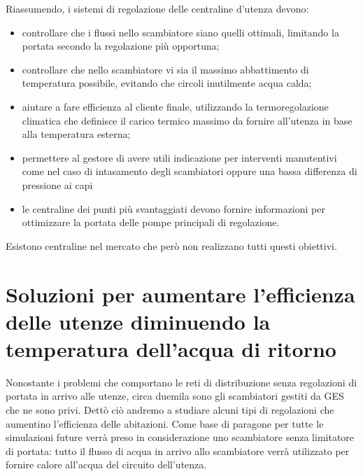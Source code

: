 \documentclass[laurea,oneside,11pt]{USiena_tesiLM}
\begin{document}
Riassumendo, i sistemi di regolazione delle centraline d'utenza devono:
\begin{itemize}
\item controllare che i flussi nello scambiatore siano quelli ottimali, limitando la portata secondo la regolazione più opportuna;
\item controllare che nello scambiatore vi sia il massimo abbattimento di temperatura possibile, evitando che circoli inutilmente acqua calda;
\item aiutare a fare efficienza al cliente finale, utilizzando la termoregolazione climatica che definisce il carico termico massimo da fornire all'utenza in base alla temperatura esterna;
\item permettere al gestore di avere utili indicazione per interventi manutentivi come nel caso di intasamento degli scambiatori oppure una bassa differenza di pressione ai capi
\item le centraline dei punti più svantaggiati devono fornire informazioni per ottimizzare la portata delle pompe principali di regolazione.
\end{itemize}

Esistono centraline nel mercato che però non realizzano tutti questi obiettivi.

\section{Soluzioni per aumentare l'efficienza delle utenze diminuendo la temperatura dell'acqua di ritorno}
Nonostante i problemi che comportano le reti di distribuzione senza regolazioni di portata in arrivo alle utenze, circa duemila sono gli scambiatori gestiti da GES che ne sono privi.
Dettò ciò andremo a studiare alcuni tipi di regolazioni che aumentino l'efficienza delle abitazioni. 
Come base di paragone per tutte le simulazioni future verrà preso in considerazione uno scambiatore senza limitatore di portata: tutto il flusso di acqua in arrivo allo scambiatore verrà utilizzato per fornire calore all'acqua del circuito dell'utenza. 


\end{document}
